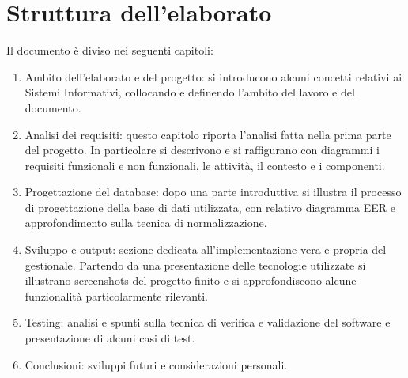\section*{Struttura dell'elaborato}
\label{sec:struttura}
Il documento è diviso nei seguenti capitoli:
\begin{enumerate}
    \item Ambito dell’elaborato e del progetto: si introducono alcuni concetti relativi ai Sistemi Informativi, collocando e definendo l'ambito del lavoro e del documento.
    \item Analisi dei requisiti: questo capitolo riporta l'analisi fatta nella prima parte del progetto. In particolare si descrivono e si raffigurano con diagrammi i requisiti funzionali e non funzionali, le attività, il contesto e i componenti.   
    \item Progettazione del database: dopo una parte introduttiva si illustra il processo di progettazione della base di dati utilizzata, con relativo diagramma EER e approfondimento sulla tecnica di normalizzazione.
    \item Sviluppo e output: sezione dedicata all'implementazione vera e propria del gestionale. Partendo da una presentazione delle tecnologie utilizzate si illustrano screenshots del progetto finito e si approfondiscono alcune funzionalità particolarmente rilevanti. 
    \item Testing: analisi e spunti sulla tecnica di verifica e validazione del software e presentazione di alcuni casi di test.   
    \item Conclusioni: sviluppi futuri e considerazioni personali.
\end{enumerate}



\clearpage
\newpage



